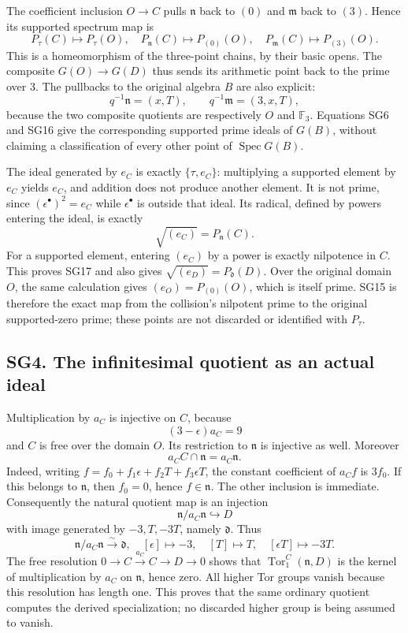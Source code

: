 \documentclass[
  10pt,
  a4paper,
]{article}
\begin{document}
The coefficient inclusion \(O\to C\) pulls \(\mathfrak n\) back to
\((0)\) and \(\mathfrak m\) back to \((3)\). Hence its supported
spectrum map is \[
P_\tau(C)\mapsto P_\tau(O),\quad
P_{\mathfrak n}(C)\mapsto P_{(0)}(O),\quad
P_{\mathfrak m}(C)\mapsto P_{(3)}(O).
\tag{SG15}
\] This is a homeomorphism of the three-point chains, by their basic
opens. The composite \(G(O)\to G(D)\) thus sends its arithmetic point
back to the prime over 3. The pullbacks to the original algebra \(B\)
are also explicit: \[
q^{-1}\mathfrak n=(x,T),\qquad
q^{-1}\mathfrak m=(3,x,T),
\tag{SG16}
\] because the two composite quotients are respectively \(O\) and
\(\mathbb F_3\). Equations SG6 and SG16 give the corresponding supported
prime ideals of \(G(B)\), without claiming a classification of every
other point of \(\operatorname{Spec}G(B)\).

The ideal generated by \(e_C\) is exactly \(\{\tau,e_C\}\): multiplying
a supported element by \(e_C\) yields \(e_C\), and addition does not
produce another element. It is not prime, since
\((\epsilon^\bullet)^2=e_C\) while \(\epsilon^\bullet\) is outside that
ideal. Its radical, defined by powers entering the ideal, is exactly \[
\sqrt{(e_C)}=P_{\mathfrak n}(C).
\tag{SG17}
\] For a supported element, entering \((e_C)\) by a power is exactly
nilpotence in \(C\). This proves SG17 and also gives
\(\sqrt{(e_D)}=P_{\mathfrak d}(D)\). Over the original domain \(O\), the
same calculation gives \((e_O)=P_{(0)}(O)\), which is itself prime. SG15
is therefore the exact map from the collision's nilpotent prime to the
original supported-zero prime; these points are not discarded or
identified with \(P_\tau\).

\subsection{SG4. The infinitesimal quotient as an actual
ideal}\label{sg4.-the-infinitesimal-quotient-as-an-actual-ideal}

Multiplication by \(a_C\) is injective on \(C\), because \[
(3-\epsilon)a_C=9
\tag{SG18}
\] and \(C\) is free over the domain \(O\). Its restriction to
\(\mathfrak n\) is injective as well. Moreover \[
a_C C\cap\mathfrak n=a_C\mathfrak n.
\tag{SG19}
\] Indeed, writing \(f=f_0+f_1\epsilon+f_2T+f_3\epsilon T\), the
constant coefficient of \(a_C f\) is \(3f_0\). If this belongs to
\(\mathfrak n\), then \(f_0=0\), hence \(f\in\mathfrak n\). The other
inclusion is immediate. Consequently the natural quotient map is an
injection \[
\mathfrak n/a_C\mathfrak n\hookrightarrow D
\] with image generated by \(-3,T,-3T\), namely \(\mathfrak d\). Thus \[
\mathfrak n/a_C\mathfrak n\xrightarrow{\sim}\mathfrak d,
\quad [\epsilon]\mapsto-3,\quad[T]\mapsto T,\quad
[\epsilon T]\mapsto-3T.
\tag{SG20}
\] The free resolution \(0\to C\xrightarrow{a_C}C\to D\to0\) shows that
\(\operatorname{Tor}_1^C(\mathfrak n,D)\) is the kernel of
multiplication by \(a_C\) on \(\mathfrak n\), hence zero. All higher Tor
groups vanish because this resolution has length one. This proves that
the same ordinary quotient computes the derived specialization; no
discarded higher group is being assumed to vanish.
\end{document}
